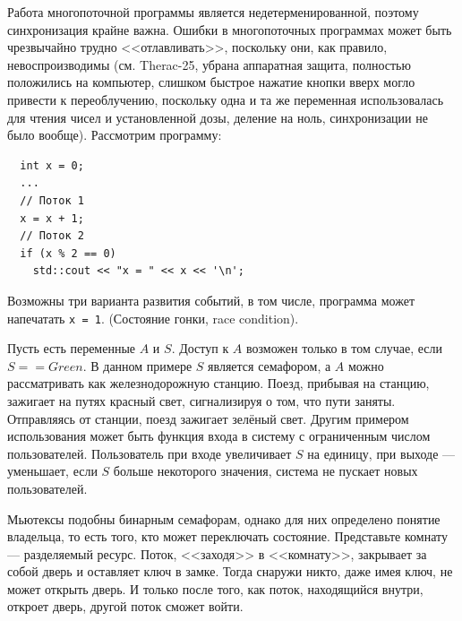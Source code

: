 \documentclass{book}
\begin{document}
Работа многопоточной программы является недетерменированной, поэтому
синхронизация крайне важна. Ошибки в многопоточных программах может быть
чрезвычайно трудно <<отлавливать>>, поскольку они, как правило,
невоспроизводимы (см. Therac-25, убрана аппаратная защита, полностью положились на компьютер,
слишком быстрое нажатие кнопки вверх могло привести к переоблучению, поскольку одна и та же
переменная использовалась для чтения чисел и установленной дозы, деление на ноль, синхронизации не
было вообще). Рассмотрим программу:
\begin{verbatim}
  int x = 0;
  ...
  // Поток 1
  x = x + 1;
  // Поток 2
  if (x % 2 == 0)
    std::cout << "x = " << x << '\n';
\end{verbatim}
Возможны три варианта развития событий, в том числе, программа может напечатать 
\texttt{x = 1}. (Состояние гонки, race condition).

Пусть есть переменные $A$ и $S$. Доступ к $A$ возможен только в том случае, если $S
== Green$. В данном примере $S$ является семафором, а $A$ можно рассматривать
как железнодорожную станцию. Поезд, прибывая на станцию, зажигает на путях
красный свет, сигнализируя о том, что пути заняты. Отправляясь от станции, поезд
зажигает зелёный свет. Другим примером использования может быть функция входа в
систему с ограниченным числом пользователей. Пользователь при входе увеличивает
$S$ на единицу, при выходе --- уменьшает, если $S$ больше некоторого значения,
система не пускает новых пользователей.

Мьютексы подобны бинарным семафорам, однако для них определено понятие
владельца, то есть того, кто может переключать состояние. Представьте комнату
--- разделяемый ресурс. Поток, <<заходя>> в <<комнату>>, закрывает за собой
дверь и оставляет ключ в замке. Тогда снаружи никто, даже имея ключ, не может
открыть дверь. И только после того, как поток, находящийся внутри, откроет дверь,
другой поток сможет войти.
\end{document}
